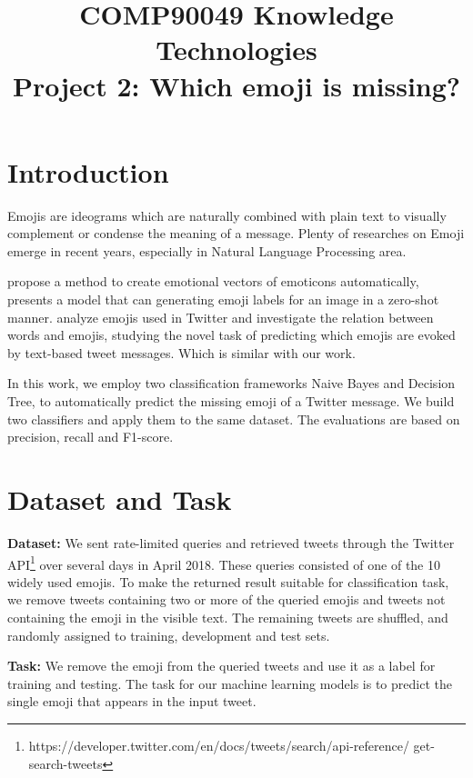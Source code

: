 \documentclass[11pt]{article}
\title{COMP90049 Knowledge Technologies \\
	Project 2: Which emoji is missing?}
\begin{document}
\maketitle

\section{Introduction}

Emojis are ideograms which are naturally combined with plain text to visually complement or condense the meaning of a message. Plenty of researches on Emoji emerge in recent years, especially in Natural Language Processing area.

\cite{Aoki2011A} propose a method to create emotional vectors of emoticons automatically, \cite{Cappallo:2015:IZE:2733373.2806335} presents a model that can generating emoji labels for an image in a zero-shot manner. \cite{Barbieri2016What} analyze emojis used in Twitter and \cite{Barbieri2017Are} investigate the relation between words and emojis, studying the novel task of predicting which emojis are evoked by text-based tweet messages. Which is similar with our work. 

In this work, we employ two classification frameworks Naive Bayes and Decision Tree, to automatically predict the missing emoji of a Twitter message. We build two classifiers and apply them to the same dataset. The evaluations are based on precision, recall and F1-score.

\section{Dataset and Task}

\noindent\textbf{Dataset:} We sent rate-limited queries and retrieved tweets through the Twitter API\footnote{https://developer.twitter.com/en/docs/tweets/search/api-reference/ get-search-tweets} over several days in April 2018. These queries consisted of one of the 10 widely used emojis. To make the returned result suitable for classification task, we remove tweets containing two or more of the queried emojis and tweets not containing the emoji in the visible text. The remaining tweets are shuffled, and randomly assigned to training, development and test sets.

\noindent\textbf{Task:} We remove the emoji from the queried tweets and use it as a label for training and testing. The task for our machine learning models is to predict the single emoji that appears in the input tweet.
\end{document}
